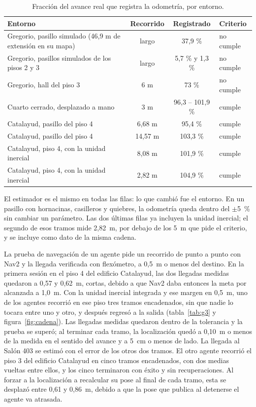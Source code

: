 \begin{table}[H]
  \centering\footnotesize{}
  \caption{Fracción del avance real que registra la odometría, por entorno.}
  \label{tab:odometria}
  \begin{tabular}{@{}>{\raggedright\arraybackslash}p{}ccl@{}}
    \toprule
    \textbf{Entorno} & \textbf{Recorrido} & \textbf{Registrado} & \textbf{Criterio} \\ \midrule
    Gregorio, pasillo simulado (46,9 m de extensión en su mapa) & largo & 37,9 \% & no cumple \\
    Gregorio, pasillos simulados de los pisos 2 y 3 & largo & 5,7 \% y 1,3 \% & no cumple \\
    Gregorio, hall del piso 3 & 6 m & 73 \% & no cumple \\
    Cuarto cerrado, desplazado a mano & 3 m & 96,3 -- 101,9 \% & cumple \\
    Catalayud, pasillo del piso 4 & 6,68 m & 95,4 \% & cumple \\
    Catalayud, pasillo del piso 4 & 14,57 m & 103,3 \% & cumple \\
    Catalayud, piso 4, con la unidad inercial & 8,08 m & 101,9 \% & cumple \\
    Catalayud, piso 4, con la unidad inercial & 2,82 m & 104,9 \% & cumple \\ \bottomrule
  \end{tabular}
\end{table}

El estimador es el mismo en todas las filas: lo que cambió fue el entorno. En un pasillo con hornacinas, casilleros y quiebres, la odometría queda dentro del $\pm$5~\% sin cambiar un parámetro. Las dos últimas filas ya incluyen la unidad inercial; el segundo de esos tramos mide 2,82~m, por debajo de los 5~m que pide el criterio, y se incluye como dato de la misma cadena.

La prueba de navegación de un agente pide un recorrido de punto a punto con Nav2 y la llegada verificada con flexómetro, a 0,5~m o menos del destino. En la primera sesión en el piso 4 del edificio Catalayud, las dos llegadas medidas quedaron a 0,57 y 0,62~m, cortas, debido a que Nav2 daba entonces la meta por alcanzada a 1,0~m. Con la unidad inercial integrada y ese margen en 0,5~m, uno de los agentes recorrió en ese piso tres tramos encadenados, sin que nadie lo tocara entre uno y otro, y después regresó a la salida (tabla~\ref{tab:g3} y figura~\ref{fig:cadena}). Las llegadas medidas quedaron dentro de la tolerancia y la prueba se superó; al terminar cada tramo, la localización quedó a 0,10~m o menos de la medida en el sentido del avance y a 5~cm o menos de lado. La llegada al Salón 403 se estimó con el error de los otros dos tramos. El otro agente recorrió el piso 3 del edificio Catalayud en cinco tramos encadenados, con dos medias vueltas entre ellos, y los cinco terminaron con éxito y sin recuperaciones. Al forzar a la localización a recalcular su pose al final de cada tramo, esta se desplazó entre 0,61 y 0,86~m, debido a que la pose que publica al detenerse el agente va atrasada.

